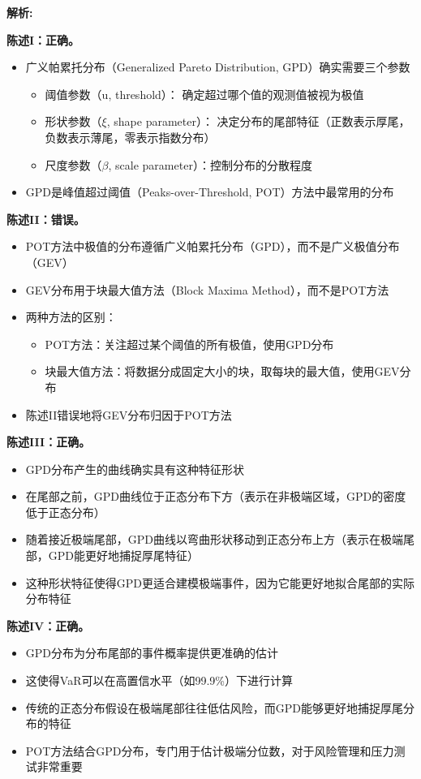 \documentclass{article}
\newenvironment{explanation}
{\textbf{解析:}\par}
{\par}
\begin{document}
\begin{explanation}
    \textbf{陈述I：正确。}
    \begin{itemize}
        \item 广义帕累托分布（Generalized Pareto Distribution, GPD）确实需要三个参数
        \begin{itemize}
        \item 阈值参数（u, threshold）： 确定超过哪个值的观测值被视为极值
            \item 形状参数（$\xi$, shape parameter）： 决定分布的尾部特征（正数表示厚尾，负数表示薄尾，零表示指数分布）
            \item 尺度参数（$\beta$, scale parameter）：控制分布的分散程度
        \end{itemize}
        \item GPD是峰值超过阈值（Peaks-over-Threshold, POT）方法中最常用的分布
    \end{itemize}
    
    \textbf{陈述II：错误。}
    \begin{itemize}
        \item POT方法中极值的分布遵循广义帕累托分布（GPD），而不是广义极值分布（GEV）
        \item GEV分布用于块最大值方法（Block Maxima Method），而不是POT方法
        \item 两种方法的区别：
        \begin{itemize}
            \item POT方法：关注超过某个阈值的所有极值，使用GPD分布
            \item 块最大值方法：将数据分成固定大小的块，取每块的最大值，使用GEV分布
        \end{itemize}
        \item 陈述II错误地将GEV分布归因于POT方法
    \end{itemize}
    
    \textbf{陈述III：正确。}
    \begin{itemize}
        \item GPD分布产生的曲线确实具有这种特征形状
        \item 在尾部之前，GPD曲线位于正态分布下方（表示在非极端区域，GPD的密度低于正态分布）
        \item 随着接近极端尾部，GPD曲线以弯曲形状移动到正态分布上方（表示在极端尾部，GPD能更好地捕捉厚尾特征）
        \item 这种形状特征使得GPD更适合建模极端事件，因为它能更好地拟合尾部的实际分布特征
    \end{itemize}
    
    \textbf{陈述IV：正确。}
    \begin{itemize}
        \item GPD分布为分布尾部的事件概率提供更准确的估计
        \item 这使得VaR可以在高置信水平（如99.9\%）下进行计算
        \item 传统的正态分布假设在极端尾部往往低估风险，而GPD能够更好地捕捉厚尾分布的特征
        \item POT方法结合GPD分布，专门用于估计极端分位数，对于风险管理和压力测试非常重要
    \end{itemize}
\end{explanation}
\end{document}
